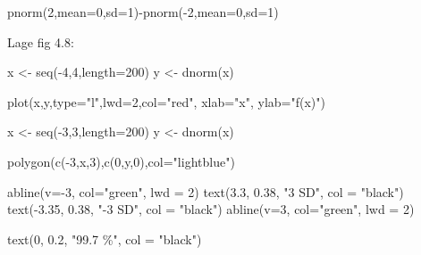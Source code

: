 \documentclass[
]{book}
\newenvironment{Shaded}{\begin{snugshade}}{\end{snugshade}}
\newcommand{\AttributeTok}[1]{\textcolor[rgb]{0.77,0.63,0.00}{#1}}
\newcommand{\DecValTok}[1]{\textcolor[rgb]{0.00,0.00,0.81}{#1}}
\newcommand{\FloatTok}[1]{\textcolor[rgb]{0.00,0.00,0.81}{#1}}
\newcommand{\FunctionTok}[1]{\textcolor[rgb]{0.00,0.00,0.00}{#1}}
\newcommand{\NormalTok}[1]{#1}
\newcommand{\OtherTok}[1]{\textcolor[rgb]{0.56,0.35,0.01}{#1}}
\newcommand{\SpecialCharTok}[1]{\textcolor[rgb]{0.00,0.00,0.00}{#1}}
\newcommand{\StringTok}[1]{\textcolor[rgb]{0.31,0.60,0.02}{#1}}
\begin{document}
\begin{Shaded}
\begin{Highlighting}[]
\FunctionTok{pnorm}\NormalTok{(}\DecValTok{2}\NormalTok{,}\AttributeTok{mean=}\DecValTok{0}\NormalTok{,}\AttributeTok{sd=}\DecValTok{1}\NormalTok{)}\SpecialCharTok{{-}}\FunctionTok{pnorm}\NormalTok{(}\SpecialCharTok{{-}}\DecValTok{2}\NormalTok{,}\AttributeTok{mean=}\DecValTok{0}\NormalTok{,}\AttributeTok{sd=}\DecValTok{1}\NormalTok{)}
\end{Highlighting}
\end{Shaded}

Lage fig 4.8:

\begin{Shaded}
\begin{Highlighting}[]
\NormalTok{x }\OtherTok{\textless{}{-}} \FunctionTok{seq}\NormalTok{(}\SpecialCharTok{{-}}\DecValTok{4}\NormalTok{,}\DecValTok{4}\NormalTok{,}\AttributeTok{length=}\DecValTok{200}\NormalTok{)}
\NormalTok{y }\OtherTok{\textless{}{-}} \FunctionTok{dnorm}\NormalTok{(x)}

\FunctionTok{plot}\NormalTok{(x,y,}\AttributeTok{type=}\StringTok{"l"}\NormalTok{,}\AttributeTok{lwd=}\DecValTok{2}\NormalTok{,}\AttributeTok{col=}\StringTok{"red"}\NormalTok{, }\AttributeTok{xlab=}\StringTok{"x"}\NormalTok{,}
  \AttributeTok{ylab=}\StringTok{"f(x)"}\NormalTok{)}

\NormalTok{x }\OtherTok{\textless{}{-}} \FunctionTok{seq}\NormalTok{(}\SpecialCharTok{{-}}\DecValTok{3}\NormalTok{,}\DecValTok{3}\NormalTok{,}\AttributeTok{length=}\DecValTok{200}\NormalTok{)}
\NormalTok{y }\OtherTok{\textless{}{-}} \FunctionTok{dnorm}\NormalTok{(x)}

\FunctionTok{polygon}\NormalTok{(}\FunctionTok{c}\NormalTok{(}\SpecialCharTok{{-}}\DecValTok{3}\NormalTok{,x,}\DecValTok{3}\NormalTok{),}\FunctionTok{c}\NormalTok{(}\DecValTok{0}\NormalTok{,y,}\DecValTok{0}\NormalTok{),}\AttributeTok{col=}\StringTok{"lightblue"}\NormalTok{)}

\FunctionTok{abline}\NormalTok{(}\AttributeTok{v=}\SpecialCharTok{{-}}\DecValTok{3}\NormalTok{, }\AttributeTok{col=}\StringTok{"green"}\NormalTok{, }\AttributeTok{lwd =} \DecValTok{2}\NormalTok{)}
\FunctionTok{text}\NormalTok{(}\FloatTok{3.3}\NormalTok{, }\FloatTok{0.38}\NormalTok{, }\StringTok{"3 SD"}\NormalTok{, }\AttributeTok{col =} \StringTok{"black"}\NormalTok{)}
\FunctionTok{text}\NormalTok{(}\SpecialCharTok{{-}}\FloatTok{3.35}\NormalTok{, }\FloatTok{0.38}\NormalTok{, }\StringTok{"{-}3 SD"}\NormalTok{, }\AttributeTok{col =} \StringTok{"black"}\NormalTok{)}
\FunctionTok{abline}\NormalTok{(}\AttributeTok{v=}\DecValTok{3}\NormalTok{, }\AttributeTok{col=}\StringTok{"green"}\NormalTok{, }\AttributeTok{lwd =} \DecValTok{2}\NormalTok{)}

\FunctionTok{text}\NormalTok{(}\DecValTok{0}\NormalTok{, }\FloatTok{0.2}\NormalTok{, }\StringTok{"99.7 \%"}\NormalTok{, }\AttributeTok{col =} \StringTok{"black"}\NormalTok{)}
\end{Highlighting}
\end{Shaded}
\end{document}
